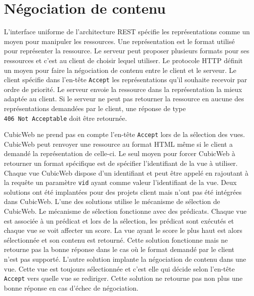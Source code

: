 \section{Négociation de contenu} 
L'interface uniforme de l'architecture REST spécifie les représentations comme 
un moyen pour manipuler les ressources. Une représentation est le format utilisé 
pour représenter la ressource. Le serveur peut proposer plusieurs formats pour ses 
ressources et c'est au client de choisir lequel utiliser. Le protocole HTTP définit 
un moyen pour faire la négociation de contenu entre le client et le serveur. Le 
client spécifie dans l'en-tête \texttt{Accept} les représentations qu'il souhaite 
recevoir par ordre de priorité. Le serveur envoie la ressource dans la 
représentation la mieux adaptée au client. Si le serveur ne peut pas retourner la 
ressource en aucune des représentations demandées par le client, une réponse de type
\texttt{406~Not~Acceptable} doit être retournée.

CubicWeb ne prend pas en compte l'en-tête \texttt{Accept} lors de la sélection
des vues. CubicWeb peut renvoyer une ressource au format HTML même si le client
a demandé la représentation  de celle-ci. Le seul moyen
pour forcer CubicWeb à retourner un format spécifique est de spécifier
l'identifiant de la vue à utiliser. Chaque vue CubicWeb dispose d'un
identifiant et peut être appelé en rajoutant à la requête un paramètre
\texttt{vid} ayant comme valeur l'identifiant de la vue. Deux solutions ont été
implantées pour des projets client mais n'ont pas été intégrées dans CubicWeb.
L'une des solutions utilise le mécanisme de sélection de CubicWeb. Le mécanisme
de sélection fonctionne avec des prédicats. Chaque vue est associée à un
prédicat et lors de la sélection, les prédicat sont exécutés et chaque vue se
voit affecter un score. La vue ayant le score le plus haut est alors
sélectionnée et son contenu est retourné. Cette solution fonctionne mais ne
retourne pas la bonne réponse dans le cas où le format demandé par le client
n'est pas supporté. L'autre solution implante la négociation de contenu dans
une vue. Cette vue est toujours sélectionnée et c'est elle qui décide selon
l'en-tête \texttt{Accept} vers quelle vue se rediriger. Cette solution ne
retourne pas non plus une bonne réponse en cas d'échec de négociation.

